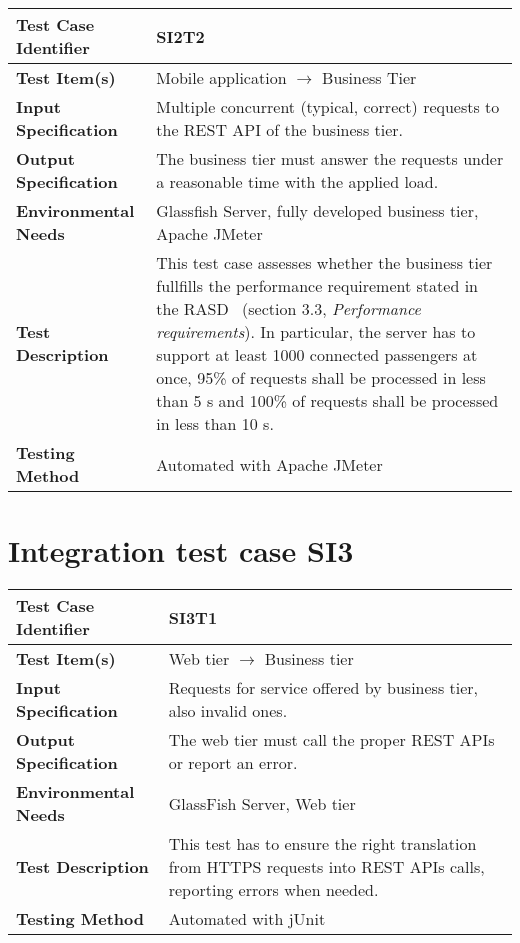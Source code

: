 \noindent\begin{tabular}{l p{}}
    \hline
    \textbf{Test Case Identifier} & SI2T2\\
    \hline
    \textbf{Test Item(s)} & Mobile application $\rightarrow$ Business Tier\\
    \hline
    \textbf{Input Specification} & Multiple concurrent (typical, correct) requests to the REST API of the business tier.\\
    \hline
    \textbf{Output Specification} & The business tier must answer the requests under a reasonable time with the applied load. \\
    \hline
    \textbf{Environmental Needs} & Glassfish Server, fully developed business tier, Apache JMeter\\
    \hline
    \textbf{Test Description} & This test case assesses whether the business tier fullfills the performance requirement stated in the RASD~\cite{mytaxi-rasd} (section 3.3, \emph{Performance requirements}). In particular, the server has to support at least 1000 connected passengers at once, 95\% of requests shall be processed in less than 5 s and 100\% of requests shall be processed in less than 10 s.\\
    \hline
    \textbf{Testing Method} & Automated with Apache JMeter \\
    \hline
\end{tabular}

\vspace{2em}

\section{Integration test case SI3}

\begin{tabular}{l p{}}
    \hline
    \textbf{Test Case Identifier} & SI3T1\\
    \hline
    \textbf{Test Item(s)} & Web tier $\rightarrow$ Business tier\\
    \hline
    \textbf{Input Specification} & Requests for service offered by business tier, also invalid ones.\\
    \hline
    \textbf{Output Specification} & The web tier must call the proper REST APIs or report an error. \\
    \hline
    \textbf{Environmental Needs} & GlassFish Server, Web tier\\
    \hline
    \textbf{Test Description} & This test has to ensure the right translation from HTTPS requests into REST APIs calls, reporting errors when needed.\\
    \hline
    \textbf{Testing Method} & Automated with jUnit \\
    \hline
\end{tabular}

